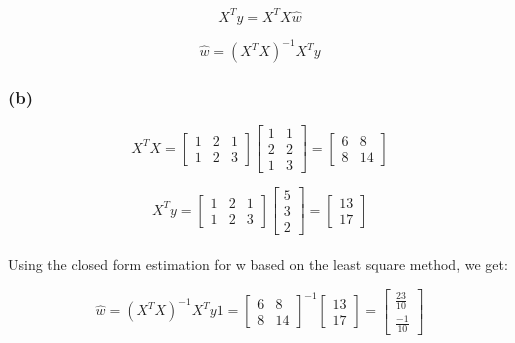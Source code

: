 \documentclass{article}
\begin{document}
\begin{equation}
    X^{T}y = X^{T}X\hat{w}
\end{equation}

\begin{equation}
    \hat{w} = {(X^{T}X)}^{-1}X^{T}y
\end{equation}

\subsubsection*{(b)}

\begin{equation}
    X^{T}X = \begin{bmatrix} 1 & 2 & 1 \\ 1 & 2 & 3 \end{bmatrix} \begin{bmatrix} 1 & 1 \\ 2 & 2 \\ 1 & 3 \end{bmatrix} = \begin{bmatrix} 6 & 8 \\ 8 & 14 \end{bmatrix}
\end{equation}

\begin{equation}
    X^{T}y = \begin{bmatrix} 1 & 2 & 1 \\ 1 & 2 & 3 \end{bmatrix} \begin{bmatrix} 5 \\ 3 \\ 2 \end{bmatrix} = \begin{bmatrix} 13 \\ 17 \end{bmatrix}
\end{equation}
\\
Using the closed form estimation for w based on the least square method, we get:

\begin{equation}
    \hat{w} = {(X^{T}X)}^{-1}X^{T}y1 = \begin{bmatrix} 6 & 8 \\ 8 & 14 \end{bmatrix}^{-1} \begin{bmatrix} 13 \\ 17 \end{bmatrix} = \begin{bmatrix} \frac{23}{10} \\ \frac{-1}{10} \end{bmatrix}
\end{equation}
\end{document}
